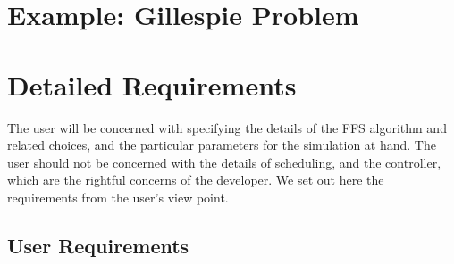 \documentclass[11pt]{article}
\begin{document}
\section{Example: Gillespie Problem}




\section{Detailed Requirements}

The user will be concerned with specifying the details of the FFS
algorithm and related choices, and the particular parameters for
the simulation at hand. The user should not be concerned with the
details of scheduling, and the controller, which are the rightful
concerns of the developer. We set out here the requirements from
the user's view point.

\subsection{User Requirements}
\end{document}
